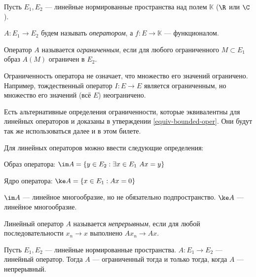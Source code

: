 Пусть $E_1, E_2$ --- линейные нормированные пространства над полем $\mathbb{K}$ ($\R$ или $\C$).

$A: E_1 \to E_2$ будем называть \textit{оператором}, а 
$f: E \to \mathbb{K}$ --- функционалом.

\begin{definition}
Оператор $A$ называется \textit{ограниченным}, если для любого ограниченного $M \subset E_1$
образ $A(M)$ ограничен в $E_2$.
\end{definition}

\begin{note}
Ограниченность оператора не означает, что множество его значений ограничено.
Например, тождественный оператор $I: E \to E$ является ограниченным, но множество его значений (всё $E$) неограничено.
\end{note}

\begin{note}
Есть альтернативные определения ограниченности, которые эквивалентны для линейных операторов и доказаны в утверждении \ref{equiv-bounded-oper}. Они будут так же использоваться далее и в этом билете.
\end{note}

\begin{definition}
Для линейных операторов можно ввести следующие определения:

Образ оператора: $\im A = \{ y \in E_2 : \exists x \in E_1 \ Ax = y\}$

Ядро оператора: $\ke A = \{ x \in E_1 : Ax = 0\}$
\end{definition}

\begin{note}
$\im A$ --- линейное многообразие, но не обязательно подпространство.
$\ke A$ --- линейное многообразие.
\end{note}

\begin{definition}
Линейный оператор $A$ называется \textit{непрерывным}, 
если для любой последовательности $x_n \to x$ выполнено $Ax_n \to Ax$.
\end{definition}

\begin{theorem}
Пусть $E_1, E_2$ --- линейные нормированные пространства. $A: E_1 \to E_2$ --- линейный оператор.
Тогда $A$ --- ограниченный тогда и только тогда, когда $A$ --- непрерывный.
\end{theorem}

